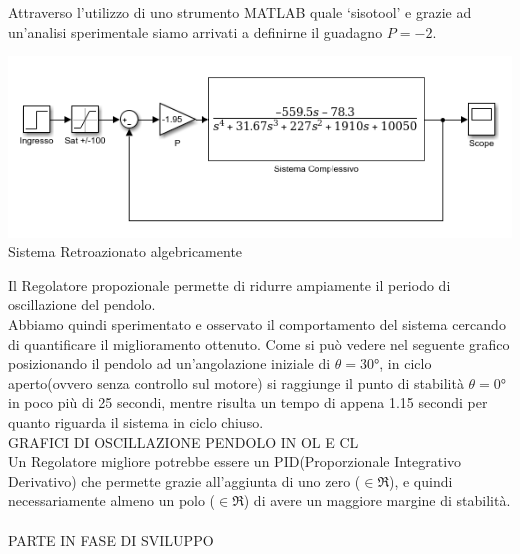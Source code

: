 Attraverso l'utilizzo di uno strumento MATLAB quale `sisotool' e grazie ad un'analisi sperimentale siamo arrivati a definirne il guadagno $P=-2$.\\
\begin{center}
	\includegraphics[scale=0.7]{SisComplessivoPNRetroazionato.PNG}\\
	{\footnotesize  Sistema Retroazionato algebricamente}
\end{center}
Il Regolatore propozionale permette di ridurre ampiamente il periodo di oscillazione del pendolo.\\
Abbiamo quindi sperimentato e osservato il comportamento del sistema cercando di quantificare il miglioramento ottenuto. 
Come si può vedere nel seguente grafico posizionando il pendolo ad un'angolazione iniziale di $\theta=\ang{30}$, in ciclo aperto(ovvero senza controllo sul motore) si raggiunge il punto di stabilità $\theta=\ang{0}$ in poco più di 25 secondi, mentre risulta un tempo di appena 1.15 secondi per quanto riguarda il sistema in ciclo chiuso.\\
GRAFICI DI OSCILLAZIONE PENDOLO IN OL E CL\\
Un Regolatore migliore potrebbe essere un PID(Proporzionale Integrativo Derivativo) che permette grazie all'aggiunta di uno zero ($\in\Re$), e quindi necessariamente almeno un polo ($\in\Re$) di avere un maggiore margine di stabilità.\\\\
PARTE IN FASE DI SVILUPPO\\\\
